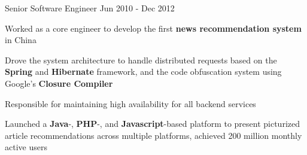\begin{cventries}
  \cventry
    {Senior Software Engineer}
    {} %
    {} %
    {Jun 2010 - Dec 2012} %
    {
      \begin{cvitems} %
        \item {Worked as a core engineer to develop the first \textbf{news recommendation system} in China}
        \item {Drove the system architecture to handle distributed requests based on the \textbf{Spring} and \textbf{Hibernate} framework, and the code obfuscation system using Google's \textbf{Closure Compiler}}
        \item {Responsible for maintaining high availability for all backend services}
        \item{Launched a \textbf{Java}-, \textbf{PHP}-, and \textbf{Javascript}-based platform to present picturized article recommendations across multiple platforms, achieved 200 million monthly active users}
      \end{cvitems}
    }

\end{cventries}
